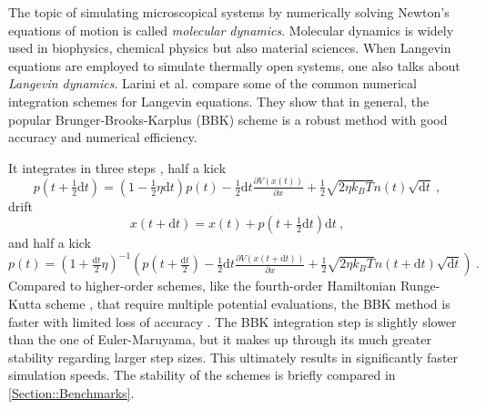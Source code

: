 	The topic of simulating microscopical systems by numerically solving Newton's equations of motion is called \textit{molecular dynamics}. Molecular dynamics is widely used in biophysics, chemical physics but also material sciences. When Langevin equations are employed to simulate thermally open systems, one also talks about \textit{Langevin dynamics}. Larini et al. \cite{larini2007langevin} compare some of the common numerical integration schemes for Langevin equations. They show that in general, the popular Brunger-Brooks-Karplus (BBK) \cite{brunger1984stochastic} scheme is a robust method with good accuracy and numerical efficiency. \newpage
	
	It integrates in three steps \cite{izaguirre2001langevin}, half a kick
	\begin{equation}
		p\left(t + \tfrac{1}{2} \text{d}t \right) =	\left(1 - \tfrac{1}{2} \eta \text{d}t \right) p(t) - \tfrac{1}{2} \text{d}t \tfrac{\partial V(x(t))}{\partial x} + \tfrac{1}{2} \sqrt{2\eta{k_B T}} n(t) \sqrt{\text{d}t}~,
	\end{equation}
	drift
	\begin{equation}
		x(t + \text{d}t) = x(t) +  p\left(t + \tfrac{1}{2} \text{d}t\right) \text{d}t~,
	\end{equation}
	and half a kick
	\begin{equation}
		p\left(t\right) =	\left(1 + \tfrac{\text{d}t}{2} \eta \right)^{-1} \left( p\left(t + \tfrac{\text{d}t}{2}\right) - \tfrac{1}{2} \text{d}t \tfrac{\partial V(x(t + \text{d}t))}{\partial x} + \tfrac{1}{2} \sqrt{2\eta{k_B T}} n({t + \text{d}t}) \sqrt{\text{d}t} \right) ~.
	\end{equation}
	Compared to higher-order schemes, like the fourth-order Hamiltonian Runge-Kutta scheme \cite{press2002numerical}, that require multiple potential evaluations, the BBK method is faster with limited loss of accuracy \cite{larini2007langevin}. The BBK integration step is slightly slower than the one of Euler-Maruyama, but it makes up through its much greater stability regarding larger step sizes. This ultimately results in significantly faster simulation speeds. The stability of the schemes is briefly compared in \autoref{Section::Benchmarks}. \\
	
